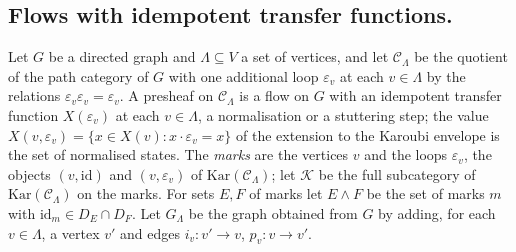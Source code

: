 \documentclass[11pt]{amsart}
\theoremstyle{definition}
\begin{document}
\subsection{Flows with idempotent transfer functions.}
Let $G$ be a directed graph and $\Lambda\subseteq V$ a set of vertices,
and let $\mathcal C_\Lambda$ be the quotient of the path category of $G$
with one additional loop $\varepsilon_v$ at each $v\in\Lambda$ by the
relations $\varepsilon_v\varepsilon_v=\varepsilon_v$. A presheaf on
$\mathcal C_\Lambda$ is a flow on $G$ with an idempotent transfer function
$X(\varepsilon_v)$ at each $v\in\Lambda$, a normalisation or a stuttering
step; the value $X(v,\varepsilon_v)=\{x\in X(v):x\cdot\varepsilon_v=x\}$
of the extension to the Karoubi envelope is the set of normalised states.
The \emph{marks} are the vertices $v$ and the loops $\varepsilon_v$, the
objects $(v,\mathrm{id})$ and $(v,\varepsilon_v)$ of
$\mathrm{Kar}(\mathcal C_\Lambda)$; let $\mathcal K$ be the full
subcategory of $\mathrm{Kar}(\mathcal C_\Lambda)$ on the marks. For sets
$E,F$ of marks let $E\wedge F$ be the set of marks $m$ with
$\mathrm{id}_m\in D_E\cap D_F$. Let $G_\Lambda$ be the graph obtained
from $G$ by adding, for each $v\in\Lambda$, a vertex $v'$ and edges
$i_v\colon v'\to v$, $p_v\colon v\to v'$.
\end{document}
